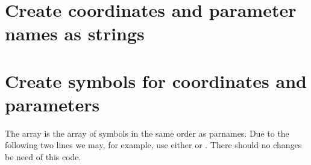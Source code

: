\documentclass[letterpaper,10pt,english]{jupyterBook}
\begin{document}
\section{Create coordinates and parameter names as strings}
\label{\detokenize{PredatorPreyGenSym:create-coordinates-and-parameter-names-as-strings}}
\begin{sphinxVerbatim}[commandchars=\\\{\}]
   
   
\end{sphinxVerbatim}


\section{Create symbols for coordinates and parameters}
\label{\detokenize{PredatorPreyGenSym:create-symbols-for-coordinates-and-parameters}}
\sphinxAtStartPar
The array  is the array of symbols in the same order as parnames.
Due to the following two lines we may, for example, use either  or
. There should no changes be need of this code.

\begin{sphinxVerbatim}[commandchars=\\\{\}]
             
       
          
        
\end{sphinxVerbatim}
\end{document}
